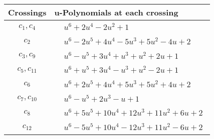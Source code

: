 \documentclass[1p]{elsarticle_modified}
\theoremstyle{definition}
\begin{document}
\begin{tabular}{m{50pt}|m{274pt}}
Crossings & \hspace{64pt}u-Polynomials at each crossing \\
\hline $$\begin{aligned}c_{1},c_{4}\end{aligned}$$&$\begin{aligned}
&u^6+2 u^4-2 u^2+1
\end{aligned}$\\
\hline $$\begin{aligned}c_{2}\end{aligned}$$&$\begin{aligned}
&u^6-2 u^5+4 u^4-5 u^3+5 u^2-4 u+2
\end{aligned}$\\
\hline $$\begin{aligned}c_{3},c_{9}\end{aligned}$$&$\begin{aligned}
&u^6- u^5+3 u^4+u^3+u^2+2 u+1
\end{aligned}$\\
\hline $$\begin{aligned}c_{5},c_{11}\end{aligned}$$&$\begin{aligned}
&u^6+u^5+3 u^4- u^3+u^2-2 u+1
\end{aligned}$\\
\hline $$\begin{aligned}c_{6}\end{aligned}$$&$\begin{aligned}
&u^6+2 u^5+4 u^4+5 u^3+5 u^2+4 u+2
\end{aligned}$\\
\hline $$\begin{aligned}c_{7},c_{10}\end{aligned}$$&$\begin{aligned}
&u^6- u^5+2 u^3- u+1
\end{aligned}$\\
\hline $$\begin{aligned}c_{8}\end{aligned}$$&$\begin{aligned}
&u^6+5 u^5+10 u^4+12 u^3+11 u^2+6 u+2
\end{aligned}$\\
\hline $$\begin{aligned}c_{12}\end{aligned}$$&$\begin{aligned}
&u^6-5 u^5+10 u^4-12 u^3+11 u^2-6 u+2
\end{aligned}$\\
\hline
\end{tabular}\\~\\
\end{document}
